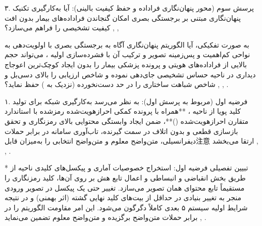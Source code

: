 

۳. پرسش سوم (محور پنهان‌نگاری فراداده و حفظ کیفیت بالینی): آیا به‌کارگیری تکنیک پنهان‌نگاری مبتنی بر برجستگی بصری  امکان گنجاندن فراداده‌های بیمار بدون افت کیفیت تشخیصی  را فراهم می‌سازد؟ , , \par

به صورت تفکیکی، آیا الگوریتم پنهان‌نگاری آگاه به برجستگی بصری  با اولویت‌دهی به نواحی کم‌اهمیت و پس‌زمینه تصویر و ترکیب آن با فشرده‌سازی اولیه ، می‌تواند حجم بالایی از فراداده‌های هویتی و پرونده پزشکی بیمار را بدون ایجاد کوچک‌ترین اعوجاج دیداری در ناحیه حساس تشخیصی  جای‌دهی نموده و شاخص ارزیابی  را بالای  دسی‌بل و شاخص شباهت ساختاری  را در حد دست‌نخورده (نزدیک به ) حفظ نماید؟ , , .\par








۱. فرضیه اول (مربوط به پرسش اول): به نظر می‌رسد به‌کارگیری شبکه  برای تولید کلید پویا از ناحیه ، **همراه با پرونده کمکی احرازهویت‌شده رمزشده با استاندارد متقارن احرازهویت‌شده ()**، ضمن ایجاد وابستگی محتوایی بالای رمزنگاری و تحقق بازسازی قطعی و بدون اتلاف در سمت گیرنده، تاب‌آوری سامانه در برابر حملات دیفرانسیلی، متن‌واضح معلوم و متن‌واضح انتخابی را به‌میزان قابل‌注意 ارتقا می‌بخشد , , .\par

* تبیین تفصیلی فرضیه اول: استخراج خصوصیات آماری و پیکسل‌های کلیدی ناحیه  از طریق بخش انقباضی و انبساطی  و اعمال تابع هش  بر روی آن‌ها، کلید رمزنگاری را مستقیماً تابع محتوای همان تصویر می‌سازد. تغییر حتی یک پیکسل در تصویر ورودی منجر به تغییر بنیادی در حداقل  از بیت‌های کلید نهایی گشته (اثر بهمنی) و در نتیجه شرایط اولیه سیستم ۵ بعدی کاملاً دگرگون می‌شود. این امر مقاومت الگوریتم را در برابر حملات متن‌واضح برگزیده  و متن‌واضح معلوم  تضمین می‌نماید , .\par


